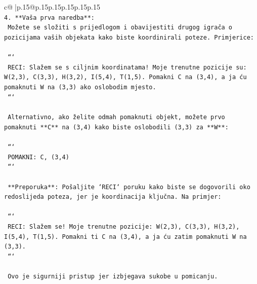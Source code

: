 \documentclass{article}
\begin{document}
{\begin{supertabular}{c@{$\;$}|p{.15\linewidth}@{}p{.15\linewidth}p{.15\linewidth}p{.15\linewidth}p{.15\linewidth}p{.15\linewidth}}
{{{\\ 
\texttt{4. **Vaša prva naredba**:} \\
\texttt{   Možete se složiti s prijedlogom i obavijestiti drugog igrača o pozicijama vaših objekata kako biste koordinirali poteze. Primjerice:} \\
\\ 
\texttt{   ```} \\
\texttt{   RECI: Slažem se s ciljnim koordinatama! Moje trenutne pozicije su: W(2,3), C(3,3), H(3,2), I(5,4), T(1,5). Pomakni C na (3,4), a ja ću pomaknuti W na (3,3) ako oslobodim mjesto.} \\
\texttt{   ```} \\
\\ 
\texttt{   Alternativno, ako želite odmah pomaknuti objekt, možete prvo pomaknuti **C** na (3,4) kako biste oslobodili (3,3) za **W**:} \\
\\ 
\texttt{   ```} \\
\texttt{   POMAKNI: C, (3,4)} \\
\texttt{   ```} \\
\\ 
\texttt{   **Preporuka**: Pošaljite `RECI` poruku kako biste se dogovorili oko redoslijeda poteza, jer je koordinacija ključna. Na primjer:} \\
\\ 
\texttt{   ```} \\
\texttt{   RECI: Slažem se! Moje trenutne pozicije: W(2,3), C(3,3), H(3,2), I(5,4), T(1,5). Pomakni ti C na (3,4), a ja ću zatim pomaknuti W na (3,3).} \\
\texttt{   ```} \\
\\ 
\texttt{   Ovo je sigurniji pristup jer izbjegava sukobe u pomicanju.} \\
            }
        }
    }
     \\ \\


\end{supertabular}}
\end{document}
